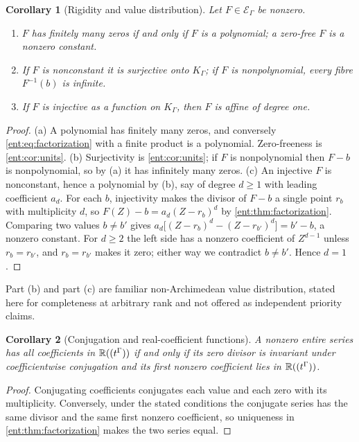 \documentclass[11pt]{article}
\theoremstyle{plain}
\theoremstyle{plain}
\theoremstyle{plain}
\newtheorem{corollary}[corollary]{Corollary}
\theoremstyle{definition}
\theoremstyle{definition}
\theoremstyle{definition}
\theoremstyle{definition}
\theoremstyle{remark}
\newcommand{\K}{K_\Gamma}\newcommand{\KD}{K_\Delta}
\newcommand{\E}{\mathcal E_\Gamma}
\begin{document}
\begin{corollary}[Rigidity and value distribution]
\label{ent:cor:value-distribution}
Let $F\in\E$ be nonzero.
\begin{enumerate}[label=\textnormal{(\alph*)},leftmargin=2em]
\item $F$ has finitely many zeros if and only if $F$ is a polynomial; a
zero-free $F$ is a nonzero constant.
\item If $F$ is nonconstant it is surjective onto $\K$; if $F$ is
nonpolynomial, every fibre $F^{-1}(b)$ is infinite.
\item If $F$ is injective as a function on $\K$, then $F$ is affine of
degree one.
\end{enumerate}
\end{corollary}
\begin{proof}
(a) A polynomial has finitely many zeros, and conversely
\eqref{ent:eq:factorization} with a finite product is a polynomial.
Zero-freeness is \cref{ent:cor:units}. (b) Surjectivity is
\cref{ent:cor:units}; if $F$ is nonpolynomial then $F-b$ is nonpolynomial,
so by (a) it has infinitely many zeros. (c) An injective $F$ is nonconstant,
hence a polynomial by (b), say of degree $d\ge1$ with leading coefficient
$a_d$. For each $b$, injectivity makes the divisor of $F-b$ a single point
$r_b$ with multiplicity $d$, so $F(Z)-b=a_d(Z-r_b)^d$ by
\cref{ent:thm:factorization}. Comparing two values $b\ne b'$ gives
$a_d\bigl[(Z-r_b)^d-(Z-r_{b'})^d\bigr]=b'-b$, a nonzero constant. For
$d\ge2$ the left side has a nonzero coefficient of $Z^{d-1}$ unless
$r_b=r_{b'}$, and $r_b=r_{b'}$ makes it zero; either way we contradict
$b\ne b'$. Hence $d=1$.
\end{proof}

Part (b) and part (c) are familiar non-Archimedean value distribution, stated
here for completeness at arbitrary rank and not offered as independent
priority claims.

\begin{corollary}[Conjugation and real-coefficient functions]
\label{ent:cor:conjugation}
A nonzero entire series has all coefficients in $\mathbb R((t^\Gamma))$ if and only
if its zero divisor is invariant under coefficientwise conjugation and its
first nonzero coefficient lies in $\mathbb R((t^\Gamma))$.
\end{corollary}
\begin{proof}
Conjugating coefficients conjugates each value and each zero with its
multiplicity. Conversely, under the stated conditions the conjugate series
has the same divisor and the same first nonzero coefficient, so uniqueness in
\cref{ent:thm:factorization} makes the two series equal.
\end{proof}
\end{document}
